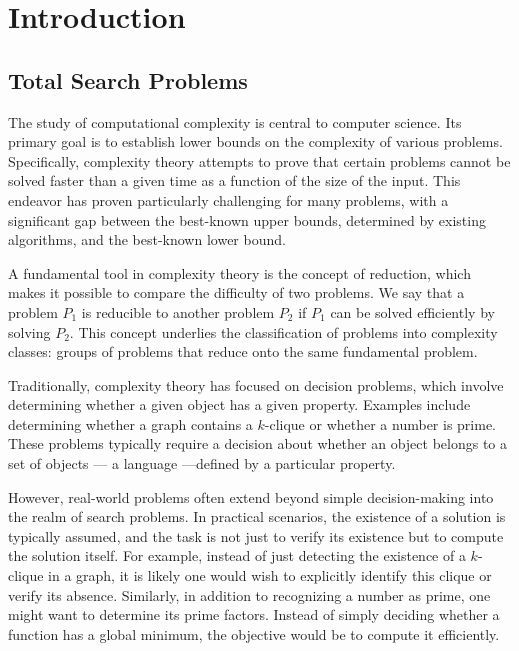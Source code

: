 \setchapterpreamble[u]{\margintoc}
\chapter{Introduction}

\section{Total Search Problems}

The study of computational complexity is central to computer science. Its primary goal is to establish lower bounds on the complexity of various problems. Specifically, complexity theory attempts to prove that certain problems cannot be solved faster than a given time as a function of the size of the input. This endeavor has proven particularly challenging for many problems, with a significant gap between the best-known upper bounds, determined by existing algorithms, and the best-known lower bound.

A fundamental tool in complexity theory is the concept of reduction, which makes it possible to compare the difficulty of two problems. We say that a problem $P_1$ is reducible to another problem $P_2$ if $P_1$ can be solved efficiently by solving $P_2$. This concept underlies the classification of problems into complexity classes: groups of problems that reduce onto the same fundamental problem.

Traditionally, complexity theory has focused on decision problems, which involve determining whether a given object has a given property. Examples include determining whether a graph contains a $k$-clique or whether a number is prime. These problems typically require a decision about whether an object belongs to a set of objects --- a language ---defined by a particular property.

However, real-world problems often extend beyond simple decision-making into the realm of search problems. In practical scenarios, the existence of a solution is typically assumed, and the task is not just to verify its existence but to compute the solution itself. For example, instead of just detecting the existence of a $k$-clique in a graph, it is likely one would wish to explicitly identify this clique or verify its absence. Similarly, in addition to recognizing a number as prime, one might want to determine its prime factors. Instead of simply deciding whether a function has a global minimum, the objective would be to compute it efficiently.

